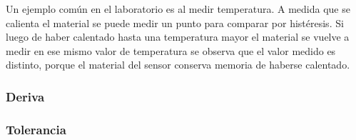 Un ejemplo común en el laboratorio es al medir temperatura. A medida que se calienta el material se puede medir un punto para comparar por histéresis. Si luego de haber calentado hasta una temperatura mayor el material se vuelve a medir en ese mismo valor de temperatura se observa que el valor medido es distinto, porque el material del sensor conserva memoria de haberse calentado.

\subsubsection{Deriva}

\subsubsection{Tolerancia}